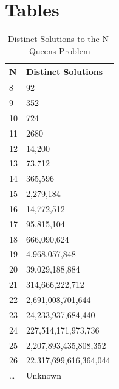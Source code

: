 \documentclass{sig-alternate}
\begin{document}

\appendix
\section{Tables}
\begin{table}[!h]
\centering
\caption{Distinct Solutions to the N-Queens Problem}
\begin{tabular}{|l|l|} \hline
N & Distinct Solutions      \\ \hline
8  & 92                     \\
9  & 352                    \\
10 & 724                    \\
11 & 2680                   \\
12 & 14,200                 \\
13 & 73,712                 \\
14 & 365,596                \\
15 & 2,279,184              \\
16 & 14,772,512             \\
17 & 95,815,104             \\
18 & 666,090,624            \\
19 & 4,968,057,848          \\
20 & 39,029,188,884         \\
21 & 314,666,222,712        \\
22 & 2,691,008,701,644      \\
23 & 24,233,937,684,440     \\
24 & 227,514,171,973,736    \\
25 & 2,207,893,435,808,352  \\
26 & 22,317,699,616,364,044 \\
\dots & Unknown				\\
\hline\end{tabular}
\label{table:numuniquesol}
\end{table}
\end{document}
